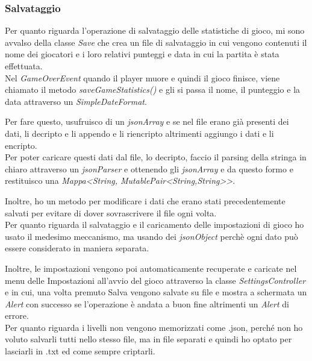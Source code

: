 
\subsubsection*{Salvataggio}

\textsf{\small Per quanto riguarda l'operazione di salvataggio delle statistiche di gioco, mi sono avvalso della classe \emph{Save} che crea un file di salvataggio in cui vengono contenuti il nome dei giocatori e i loro relativi punteggi e data in cui la partita è stata effettuata.} \\

\textsf{\small Nel \emph{GameOverEvent} quando il player muore e quindi il gioco finisce, viene chiamato il metodo \emph{saveGameStatistics()} e gli si passa il nome, il punteggio e la data attraverso un \emph{SimpleDateFormat}.}

\textsf{\small Per fare questo, usufruisco di un \emph{jsonArray} e se nel file erano già presenti dei dati, li decripto e li appendo e li riencripto altrimenti aggiungo i dati e li encripto.} \\

\textsf{\small Per poter caricare questi dati dal file, lo decripto, faccio il parsing della stringa in chiaro attraverso un \emph{jsonParser} e ottenendo gli \emph{jsonArray} e da questo formo e restituisco una \emph{Mappa<String, MutablePair<String,String>>}.}

\textsf{\small Inoltre, ho un metodo per modificare i dati che erano stati precedentemente salvati per evitare di dover sovrascrivere il file ogni volta.}\\

\textsf{\small Per quanto riguarda il salvataggio e il caricamento delle impostazioni di gioco ho usato il medesimo meccanismo, ma usando dei \emph{jsonObject} perchè ogni dato può essere considerato in maniera separata.}

\textsf{\small Inoltre, le impostazioni vengono poi automaticamente recuperate e caricate nel menu delle Impostazioni all'avvio del gioco attraverso la classe \emph{SettingsController} e in cui, una volta premuto Salva vengono salvate su file e mostra a schermata un \emph{Alert} con successo se l'operazione è andata a buon fine altrimenti un \emph{Alert} di errore.} \\

\textsf{\small Per quanto riguarda i livelli non vengono memorizzati come .json, perché non ho voluto salvarli tutti nello stesso file, ma in file separati e quindi ho optato per lasciarli in .txt ed come sempre criptarli. }

